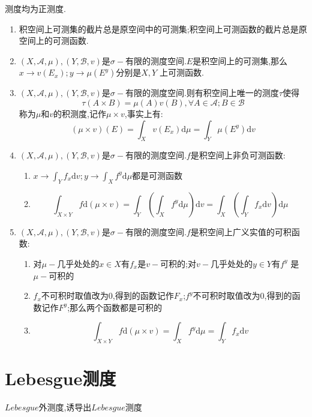 测度均为正测度.
\begin{enumerate}
  \item 积空间上可测集的截片总是原空间中的可测集;积空间上可测函数的截片总是原空间上的可测函数.
  \item $(X,\mathscr{A},\mu),(Y,\mathscr{B},v)$是$\sigma-$有限的测度空间.$E$是积空间上的可测集,那么$x\to v(E_x);y\to\mu(E^y)$分别是$X,Y$ 上可测函数.
  \item $(X,\mathscr{A},\mu),(Y,\mathscr{B},v)$是$\sigma-$有限的测度空间.则有积空间上唯一的测度$\tau$使得$$\tau(A\times B)=\mu(A) v(B),\forall A\in\mathscr{A};B\in\mathscr{B}$$称为$\mu$和$v$的积测度,记作$\mu\times v$,事实上有:
      $$(\mu\times v)(E)=\int_X v(E_x)\mathrm{d}\mu=\int_Y \mu(E^y)\mathrm{d}v$$
  \item $(X,\mathscr{A},\mu),(Y,\mathscr{B},v)$是$\sigma-$有限的测度空间.$f$是积空间上非负可测函数:
  \begin{enumerate}
  \item $x\to\int_Y f_x\mathrm{d}v;y\to\int_X f^y\mathrm{d}\mu$都是可测函数
  \item $$\int_{X\times Y}f\mathrm{d}(\mu\times v)=\int_Y\left(\int_X f^y\mathrm{d}\mu\right)\mathrm{d}v=\int_X\left(\int_Y f_x\mathrm{d}v\right)\mathrm{d}\mu$$
  \end{enumerate}
  \item $(X,\mathscr{A},\mu),(Y,\mathscr{B},v)$是$\sigma-$有限的测度空间.$f$是积空间上广义实值的可积函数:
  \begin{enumerate}
  \item 对$\mu-$几乎处处的$x\in X$有$f_x$是$v-$可积的;对$v-$几乎处处的$y\in Y$有$f^y$ 是$\mu-$可积的
  \item $f_x$不可积时取值改为0,得到的函数记作$F_x$;$f^y$不可积时取值改为0,得到的函数记作$F^y$;那么两个函数都是可积的
  \item $$\int_{X\times Y}f\mathrm{d}(\mu\times v)=\int_X f^y\mathrm{d}\mu=\int_Yf_x\mathrm{d}v$$
  \end{enumerate}
\end{enumerate}

\section{Lebesgue测度}

$Lebesgue$外测度,诱导出$Lebesgue$测度

